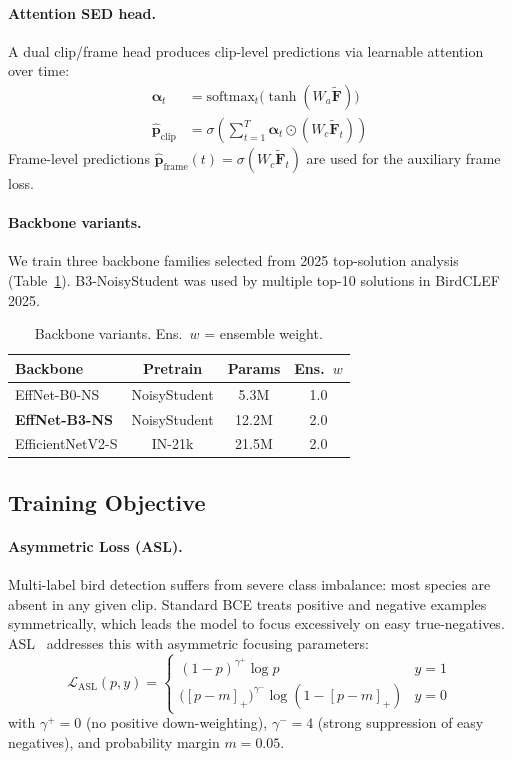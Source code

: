 \documentclass[10pt,twocolumn]{article}
\newcommand{\tabref}[1]{Table~\ref{#1}}
\begin{document}
\paragraph{Attention SED head.}
A dual clip/frame head produces clip-level predictions via
learnable attention over time:
\begin{align}
  \bm{\alpha}_t &= \text{softmax}_t\!\bigl(\tanh(W_a \tilde{\mathbf{F}})\bigr) \label{eq:att} \\
  \hat{\bm{p}}_\text{clip} &= \sigma\!\left(\sum_{t=1}^{T} \bm{\alpha}_t \odot (W_c \tilde{\mathbf{F}}_t)\right)
  \label{eq:clip_pred}
\end{align}
Frame-level predictions $\hat{\bm{p}}_\text{frame}(t) = \sigma(W_c \tilde{\mathbf{F}}_t)$
are used for the auxiliary frame loss.

\paragraph{Backbone variants.}
We train three backbone families selected from 2025 top-solution analysis
(\tabref{tab:backbones}).
B3-NoisyStudent was used by multiple top-10 solutions in BirdCLEF 2025.

\begin{table}[h]
\centering
\small
\caption{Backbone variants. Ens.\ $w$ = ensemble weight.}
\label{tab:backbones}
\begin{tabular}{lccc}
\toprule
Backbone & Pretrain & Params & Ens.\ $w$ \\
\midrule
EffNet-B0-NS & NoisyStudent  & 5.3M  & 1.0 \\
\textbf{EffNet-B3-NS} & NoisyStudent  & 12.2M & 2.0 \\
EfficientNetV2-S & IN-21k & 21.5M & 2.0 \\
\bottomrule
\end{tabular}
\end{table}

\subsection{Training Objective}
\label{sec:loss}

\paragraph{Asymmetric Loss (ASL).}
Multi-label bird detection suffers from severe class imbalance: most species
are absent in any given clip.
Standard BCE treats positive and negative examples symmetrically, which
leads the model to focus excessively on easy true-negatives.
ASL~\cite{ridnik2021asl} addresses this with asymmetric focusing parameters:
\begin{equation}
  \mathcal{L}_\text{ASL}(p, y) =
  \begin{cases}
    (1-p)^{\gamma^+} \log p & y=1 \\
    \bigl([p - m]_+\bigr)^{\gamma^-} \log(1 - [p-m]_+) & y=0
  \end{cases}
  \label{eq:asl}
\end{equation}
with $\gamma^+=0$ (no positive down-weighting),
$\gamma^-=4$ (strong suppression of easy negatives), and
probability margin $m=0.05$.
\end{document}
